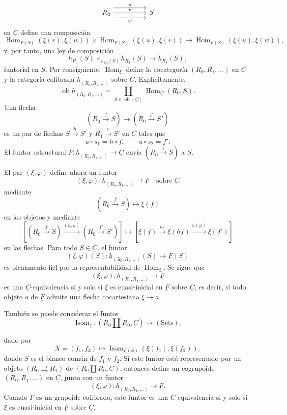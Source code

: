 
\[
\begin{tikzcd}[column sep=huge]
 R_0 \arrow[r,shift left=3,"u"]
     \arrow[r,"v"]
     \arrow[r,shift right=3,"w"']
 & S
\end{tikzcd}
\]
en $\underline C$ define una composición
\[
 \operatorname{Hom}_{\underline F(S)}(\xi(v),\xi(w))
 \times
 \operatorname{Hom}_{\underline F(S)}(\xi(u),\xi(v))
 \longrightarrow
 \operatorname{Hom}_{\underline F(S)}(\xi(u),\xi(w)),
\]
y, por tanto, una ley de composición
\[
 h_{R_1}(S)\times_{h_{R_0}(S)}h_{R_1}(S)
 \longrightarrow h_{R_1}(S),
\]
funtorial en $S$. Por consiguiente, $\operatorname{Hom}_\xi$ define la
cocategoría $(R_0,R_1,\ldots)$ en $\underline C$ y la categoría
cofibrada $\underline h_{(R_0,R_1,\ldots)}$ sobre $\underline C$.
Explícitamente,
\[
 \operatorname{ob}\underline h_{(R_0,R_1,\ldots)}
 =\coprod_{S\in\operatorname{ob}(\underline C)}
   \operatorname{Hom}_{\underline C}(R_0,S).
\]
Una flecha
\[
 (R_0\xrightarrow fS)\longrightarrow(R_0\xrightarrow{f'}S')
\]
es un par de flechas $S\xrightarrow hS'$ y $R_1\xrightarrow uS'$ en
$\underline C$ tales que
\[
 u\circ s_1=h\circ f,
 \qquad u\circ s_2=f'.
\]
El funtor estructural
$P:\underline h_{(R_0,R_1,\ldots)}\longrightarrow\underline C$ envía
$(R_0\xrightarrow fS)$ a $S$.

El par $(\xi,\varphi)$ define ahora un funtor
\[
 (\xi,\varphi):\underline h_{(R_0,R_1,\ldots)}
 \longrightarrow\underline F
 \quad\text{sobre }\underline C
\]
mediante
\[
 (R_0\xrightarrow fS)\longmapsto\xi(f)
\]
en los objetos y mediante
\[
 \left[(R_0\xrightarrow fS)
 \xrightarrow{(h,u)}(R_0\xrightarrow{f'}S')\right]
 \longmapsto
 \left[\xi(f)\xrightarrow{h_*}\xi(hf)
 \xrightarrow{u(\varphi)}\xi(f')\right]
\]
en las flechas. Para todo $S\in\underline C$, el funtor
\[
 (\xi,\varphi)(S):
 \underline h_{(R_0,R_1,\ldots)}(S)\longrightarrow\underline F(S)
\]
es plenamente fiel por la representabilidad de
$\operatorname{Hom}_\xi$. Se sigue que
\[
 (\xi,\varphi):\underline h_{(R_0,R_1,\ldots)}
 \longrightarrow\underline F
\]
es una $\underline C$-equivalencia si y solo si $\xi$ es cuasi-inicial
en $\underline F$ sobre $\underline C$, es decir, si todo objeto $a$ de
$\underline F$ admite una flecha cocartesiana
$\xi\longrightarrow a$.

También se puede considerar el funtor
\[
 \operatorname{Isom}_\xi:
 (R_0\amalg R_0,\underline C)\longrightarrow(\mathrm{Sets}),
\]


dado por
\[
 X=(f_1,f_2)\longmapsto
 \operatorname{Isom}_{\underline F(S)}(\xi(f_1),\xi(f_2)),
\]
donde $S$ es el blanco común de $f_1$ y $f_2$. Si este funtor está
representado por un objeto $(R_0\rightrightarrows R_1)$ de
$(R_0\amalg R_0,\underline C)$, entonces define un cogrupoide
$(R_0,R_1,\ldots)$ en $\underline C$, junto con un funtor
\[
 (\xi,\varphi):\underline h_{(R_0,R_1,\ldots)}
 \longrightarrow\underline F.
\]
Cuando $\underline F$ es un grupoide cofibrado, este funtor es una
$\underline C$-equivalencia si y solo si $\xi$ es cuasi-inicial en
$\underline F$ sobre $\underline C$.
